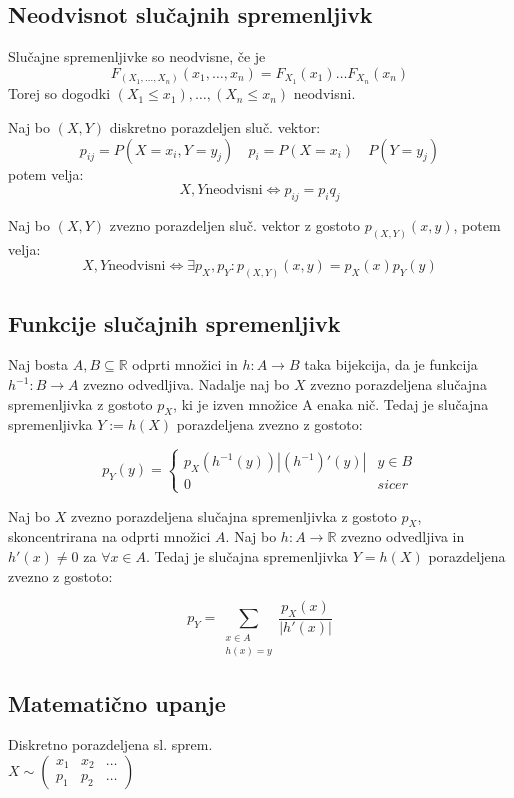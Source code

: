 \begin{multicols}{5}
\subsection{Neodvisnot slučajnih spremenljivk}
Slučajne spremenljivke so neodvisne, če je
\[ F_{(X_1, \dots , X_n)}(x_1, \dots, x_n) = F_{X_1}(x_1) \dots F_{X_n}(x_n)\]
Torej so dogodki $(X_1 \leq x_1), \dots , (X_n \leq x_n)$ neodvisni.

Naj bo $(X, Y)$ diskretno porazdeljen sluč. vektor:
\[ p_{ij} = P(X = x_i, Y = y_j) \quad p_i = P(X = x_i) \quad P(Y = y_j) \]
potem velja:
\[ X, Y \text{neodvisni} \iff p_{ij} = p_i q_j \]


Naj bo $(X, Y)$ zvezno porazdeljen sluč. vektor z gostoto $ p_{(X, Y)}(x,y)$, potem velja:
\[ X, Y \text{neodvisni} \iff \exists p_X, p_Y: p_{(X,Y)}(x,y) = p_X(x) p_Y(y)\]

\subsection{Funkcije slučajnih spremenljivk}
Naj bosta $A, B \subseteq \mathbb{R}$ odprti množici in $h: A \to B$ taka bijekcija, da je funkcija
$h^{-1}: B \to A$ zvezno odvedljiva. Nadalje naj bo $X$ zvezno porazdeljena slučajna
spremenljivka z gostoto $p_X$, ki je izven množice A enaka nič. Tedaj je slučajna
spremenljivka $Y := h(X)$ porazdeljena zvezno z gostoto:

\[ p_Y(y) = \begin{cases}
	p_X\left( h^{-1}(y) \right) \left|(h^{-1})'(y)\right| & y \in B \\
	0 & sicer	
\end{cases}\]

Naj bo $X$ zvezno porazdeljena slučajna spremenljivka z gostoto $p_X$, skoncentrirana na odprti množici $A$. Naj bo $h: A \to \mathbb{R}$ zvezno odvedljiva in $h'(x) \neq 0$ za $\forall x \in A$. 
Tedaj je slučajna spremenljivka $Y = h(X)$ porazdeljena zvezno z gostoto:

\[ p_Y = \sum_{\substack{x \in A \\ h(x) = y}} \frac{p_X(x)}{|h'(x)|}\]


\subsection{Matematično upanje}
Diskretno porazdeljena sl. sprem. \\
$ X \sim \left( \begin{matrix}
	x_1 & x_2 & \dots \\
	p_1 & p_2 & \dots
\end{matrix}\right) $


\end{multicols}

